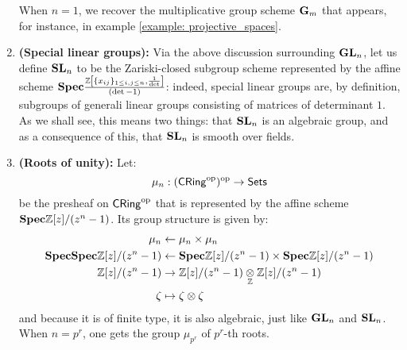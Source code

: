 \begin{example}
\begin{enumerate}
                        When $n = 1$, we recover the multiplicative group scheme $\mathbf{G}_m$ that appears, for instance, in example \ref{example: projective_spaces}.
                        \item \textbf{(Special linear groups):} Via the above discussion surrounding $\mathbf{GL}_n$, let us define $\mathbf{SL}_n$ to be the Zariski-closed subgroup scheme represented by the affine scheme $\mathbf{Spec} \frac{\mathbb{Z}\left[\{x_{ij}\}_{1 \leq i,j \leq n}, \frac{1}{\det}\right]}{(\det - 1)}$: indeed, special linear groups are, by definition, subgroups of generali linear groups consisting of matrices of determinant $1$. As we shall see, this means two things: that $\mathbf{SL}_n$ is an algebraic group, and as a consequence of this, that $\mathbf{SL}_n$ is smooth over fields. 
                        \item \textbf{(Roots of unity):} Let:
                            $$\mu_n: (\mathsf{CRing}^{\mathrm{op}})^{\mathrm{op}} \to \mathsf{Sets}$$
                        be the presheaf on $\mathsf{CRing}^{\mathrm{op}}$ that is represented by the affine scheme $\mathbf{Spec} \mathbb{Z}[z]/(z^n - 1)$. Its group structure is given by:
                            $$
                                \begin{aligned}
                                    \mu_n & \leftarrow \mu_n \x \mu_n
                                    \\
                                    \Spec \Spec \Z[z]/(z^n - 1) & \leftarrow \Spec \Z[z]/(z^n - 1) \x \Spec \Z[z]/(z^n - 1)
                                    \\
                                    \Z[z]/(z^n - 1) & \to \Z[z]/(z^n - 1) \tensor_{\Z} \Z[z]/(z^n - 1)
                                    \\
                                    \zeta & \mapsto \zeta \tensor \zeta
                                \end{aligned}
                            $$
                        and because it is of finite type, it is also algebraic, just like $\mathbf{GL}_n$ and $\mathbf{SL}_n$. When $n = p^r$, one gets the group $\mu_{p^r}$ of $p^r$-th roots. 
                    \end{enumerate}
                \end{example}
                
